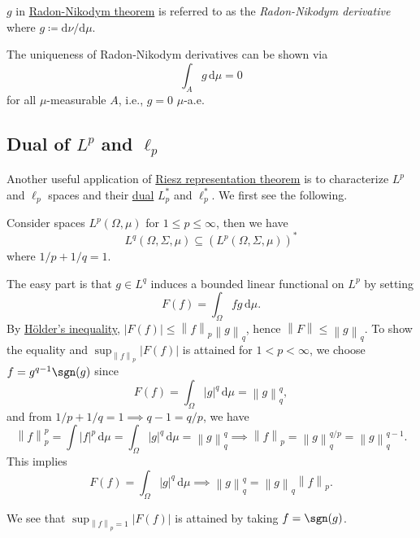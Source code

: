 \begin{notation}
	\(g\) in \hyperref[thm:Radon-Nikodym]{Radon-Nikodym theorem} is referred to as the \emph{Radon-Nikodym derivative} where \(g \coloneqq \mathrm{d}\nu /\mathrm{d}\mu \).
\end{notation}

\begin{note}[Uniqueness]
	The uniqueness of Radon-Nikodym derivatives can be shown via
	\[
		\int _A g\,\mathrm{d} \mu = 0
	\]
	for all \(\mu \)-measurable \(A\), i.e., \(g=0\) \(\mu\)-a.e.
\end{note}

\subsection{Dual of \(L^p\) and \(\ell _p\)}
Another useful application of \hyperref[thm:Riesz-representation]{Riesz representation theorem} is to characterize \(L^p\) and \(\ell _p\) spaces and their \hyperref[def:dual-space]{dual} \(L^{\ast} _p\) and \(\ell ^{\ast} _p\). We first see the following.
\begin{remark}
	Consider spaces \(L^p(\Omega , \mu )\) for \(1 \leq p \leq \infty \), then we have
	\[
		L^{q}(\Omega , \Sigma , \mu )\subseteq (L^p(\Omega , \Sigma , \mu ))^{\ast}
	\]
	where \(1 / p + 1 / q = 1\).
\end{remark}
\begin{explanation}
	The easy part is that \(g\in L^q\) induces a bounded linear functional on \(L^p\) by setting
	\[
		F(f) = \int _\Omega fg\,\mathrm{d} \mu.
	\]
	By \hyperref[lma:Holder-ineq]{Hölder's inequality}, \(\left\vert F(f) \right\vert \leq \left\lVert f\right\rVert _p \left\lVert g\right\rVert _q\), hence \(\left\lVert F\right\rVert \leq \left\lVert g\right\rVert _q\). To show the equality and \(\sup _{\left\lVert f\right\rVert _p}\left\vert F(f) \right\vert \) is attained for \(1 < p < \infty \), we choose \(f = g^{q - 1}\sgn(g)\) since
	\[
		F(f) = \int _\Omega \left\vert g \right\vert ^q\,\mathrm{d} \mu = \left\lVert g\right\rVert ^q_q,
	\]
	and from \(1 / p + 1 / q = 1 \implies q-1 = q / p\), we have
	\[
		\left\lVert f\right\rVert ^p_p = \int \left\vert f \right\vert ^p \,\mathrm{d} \mu= \int _\Omega \left\vert g \right\vert ^q\,\mathrm{d} \mu = \left\lVert g\right\rVert _q^q \implies \left\lVert f\right\rVert _p = \left\lVert g\right\rVert _q^{q / p} = \left\lVert g\right\rVert _q^{q - 1}.
	\]
	This implies
	\[
		F(f) = \int _\Omega \left\vert g \right\vert ^q\,\mathrm{d} \mu \implies \left\lVert g\right\rVert ^q_q = \left\lVert g\right\rVert _q \left\lVert f\right\rVert _p.
	\]
	\begin{note}
		We see that \(\sup _{\left\lVert f\right\rVert _p = 1} \left\vert F(f) \right\vert \) is attained by taking \(f = \sgn(g)\).
	\end{note}
\end{explanation}


